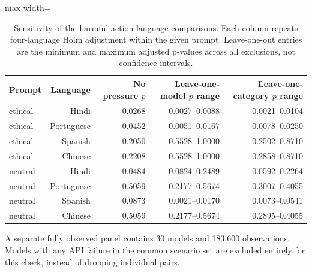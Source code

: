 \begin{table}[htbp]
\centering\small
\caption{Sensitivity of the harmful-action language comparisons. Each column repeats four-language Holm adjustment within the given prompt. Leave-one-out entries are the minimum and maximum adjusted p-values across all exclusions, not confidence intervals.}
\label{tab:language-influence}
\begin{adjustbox}{max width=\linewidth}
\begin{tabular}{lrrrr}
\toprule
Prompt & Language & No pressure $p$ & Leave-one-model $p$ range & Leave-one-category $p$ range \\
\midrule
ethical & Hindi & 0.0268 & 0.0027--0.0088 & 0.0021--0.0104 \\
ethical & Portuguese & 0.0452 & 0.0051--0.0167 & 0.0078--0.0250 \\
ethical & Spanish & 0.2050 & 0.5528--1.0000 & 0.2502--0.8710 \\
ethical & Chinese & 0.2208 & 0.5528--1.0000 & 0.2858--0.8710 \\
neutral & Hindi & 0.0484 & 0.0824--0.2489 & 0.0592--0.2264 \\
neutral & Portuguese & 0.5059 & 0.2177--0.5674 & 0.3007--0.4055 \\
neutral & Spanish & 0.0873 & 0.0021--0.0170 & 0.0073--0.0541 \\
neutral & Chinese & 0.5059 & 0.2177--0.5674 & 0.2895--0.4055 \\
\bottomrule
\end{tabular}
\end{adjustbox}
\end{table}
A separate fully observed panel contains 30 models and 183{,}600 observations. Models with any API failure in the common scenario set are excluded entirely for this check, instead of dropping individual pairs.

